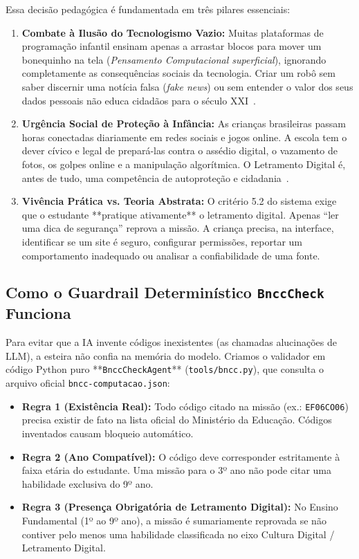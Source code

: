 \documentclass[11pt,a4paper]{article}
\begin{document}
Essa decisão pedagógica é fundamentada em três pilares essenciais:
\begin{enumerate}
  \item \textbf{Combate à Ilusão do Tecnologismo Vazio:} Muitas plataformas de programação infantil ensinam apenas a arrastar blocos para mover um bonequinho na tela (\textit{Pensamento Computacional superficial}), ignorando completamente as consequências sociais da tecnologia. Criar um robô sem saber discernir uma notícia falsa (\textit{fake news}) ou sem entender o valor dos seus dados pessoais não educa cidadãos para o século XXI~\cite{buckingham2007digital, unesco2018digital}.
  \item \textbf{Urgência Social de Proteção à Infância:} As crianças brasileiras passam horas conectadas diariamente em redes sociais e jogos online. A escola tem o dever cívico e legal de prepará-las contra o assédio digital, o vazamento de fotos, os golpes online e a manipulação algorítmica. O Letramento Digital é, antes de tudo, uma competência de autoproteção e cidadania~\cite{livingstone2017children}.
  \item \textbf{Vivência Prática vs. Teoria Abstrata:} O critério 5.2 do sistema exige que o estudante **pratique ativamente** o letramento digital. Apenas ``ler uma dica de segurança'' reprova a missão. A criança precisa, na interface, identificar se um site é seguro, configurar permissões, reportar um comportamento inadequado ou analisar a confiabilidade de uma fonte.
\end{enumerate}

\subsection{Como o Guardrail Determinístico \texttt{BnccCheck} Funciona}
Para evitar que a IA invente códigos inexistentes (as chamadas alucinações de LLM), a esteira não confia na memória do modelo. Criamos o validador em código Python puro **\texttt{BnccCheckAgent}** (\texttt{tools/bncc.py}), que consulta o arquivo oficial \texttt{bncc-computacao.json}:
\begin{itemize}[noitemsep]
  \item \textbf{Regra 1 (Existência Real):} Todo código citado na missão (ex.: \texttt{EF06CO06}) precisa existir de fato na lista oficial do Ministério da Educação. Códigos inventados causam bloqueio automático.
  \item \textbf{Regra 2 (Ano Compatível):} O código deve corresponder estritamente à faixa etária do estudante. Uma missão para o 3º ano não pode citar uma habilidade exclusiva do 9º ano.
  \item \textbf{Regra 3 (Presença Obrigatória de Letramento Digital):} No Ensino Fundamental (1º ao 9º ano), a missão é sumariamente reprovada se não contiver pelo menos uma habilidade classificada no eixo Cultura Digital / Letramento Digital.
\end{itemize}
\end{document}
